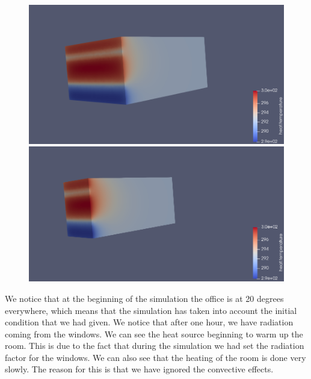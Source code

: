 \begin{figure}[H]       
	\begin{minipage}[t]{0.47\linewidth}
		\centering
		\includegraphics[width=\linewidth]{"images/enkf/sim_3.png"}
	\end{minipage}
	\begin{minipage}[t]{0.48\linewidth}
		\centering
		\includegraphics[width=\linewidth]{"images/enkf/sim_4.png"}
	\end{minipage}
	\label{lorenz:exact3D}
\end{figure}
\noindent We notice that at the beginning of the simulation the office is at 20 degrees everywhere, which means that the simulation has taken into account the initial condition that we had given. We notice that after one hour, we have radiation coming from the windows. We can see the heat source beginning to warm up the room. This is due to the fact that during the simulation we had set the radiation factor for the windows. We can also see that the heating of the room is done very slowly. The reason for this is that we have ignored the convective effects.
\newpage
